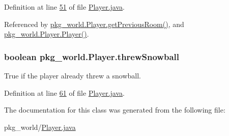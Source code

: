 Definition at line \hyperlink{Player_8java_source_l00051}{51} of file \hyperlink{Player_8java_source}{Player.\-java}.



Referenced by \hyperlink{Player_8java_source_l00121}{pkg\-\_\-world.\-Player.\-get\-Previous\-Room()}, and \hyperlink{Player_8java_source_l00068}{pkg\-\_\-world.\-Player.\-Player()}.

\hypertarget{classpkg__world_1_1Player_ab49e508229cc7834ec48d18c6b61df1a}{
\subsubsection[{threw\-Snowball}]{\setlength{\rightskip}{0pt plus 5cm}boolean pkg\-\_\-world.\-Player.\-threw\-Snowball\hspace{0.3cm}{\ttfamily [private]}}}\label{classpkg__world_1_1Player_ab49e508229cc7834ec48d18c6b61df1a}


True if the player already threw a snowball. 



Definition at line \hyperlink{Player_8java_source_l00061}{61} of file \hyperlink{Player_8java_source}{Player.\-java}.



The documentation for this class was generated from the following file\-:\begin{DoxyCompactItemize}
\item 
pkg\-\_\-world/\hyperlink{Player_8java}{Player.\-java}\end{DoxyCompactItemize}
